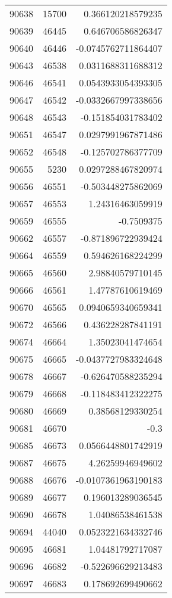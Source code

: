 \begin{tabular}{r | r | r}
90638 & 15700 & 0.366120218579235 \\
90639 & 46445 & 0.646706586826347 \\
90640 & 46446 & -0.0745762711864407 \\
90643 & 46538 & 0.0311688311688312 \\
90646 & 46541 & 0.0543933054393305 \\
90647 & 46542 & -0.0332667997338656 \\
90648 & 46543 & -0.151854031783402 \\
90651 & 46547 & 0.0297991967871486 \\
90652 & 46548 & -0.125702786377709 \\
90655 & 5230 & 0.0297288467820974 \\
90656 & 46551 & -0.503448275862069 \\
90657 & 46553 & 1.24316463059919 \\
90659 & 46555 & -0.7509375 \\
90662 & 46557 & -0.871896722939424 \\
90664 & 46559 & 0.594626168224299 \\
90665 & 46560 & 2.98840579710145 \\
90666 & 46561 & 1.47787610619469 \\
90670 & 46565 & 0.0940659340659341 \\
90672 & 46566 & 0.436228287841191 \\
90674 & 46664 & 1.35023041474654 \\
90675 & 46665 & -0.0437727983324648 \\
90678 & 46667 & -0.626470588235294 \\
90679 & 46668 & -0.118483412322275 \\
90680 & 46669 & 0.38568129330254 \\
90681 & 46670 & -0.3 \\
90685 & 46673 & 0.0566448801742919 \\
90687 & 46675 & 4.26259946949602 \\
90688 & 46676 & -0.0107361963190183 \\
90689 & 46677 & 0.196013289036545 \\
90690 & 46678 & 1.04086538461538 \\
90694 & 44040 & 0.0523221634332746 \\
90695 & 46681 & 1.04481792717087 \\
90696 & 46682 & -0.522696629213483 \\
90697 & 46683 & 0.178692699490662 \\

\end{tabular}
